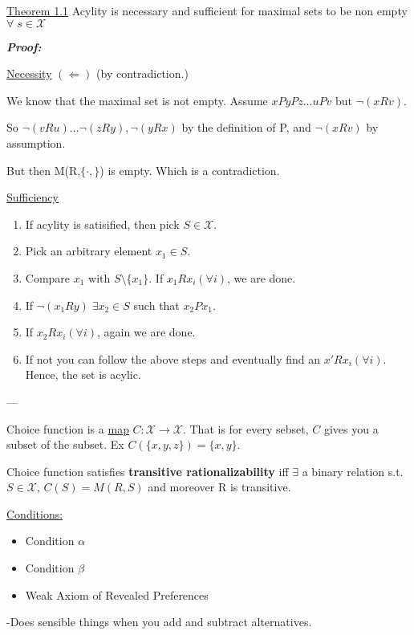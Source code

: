 \documentclass{article}
\newcommand{\X}{\mathcal{X}}
\begin{document}
\underline{Theorem 1.1}
Acylity is necessary and sufficient for maximal sets to be non empty $\forall \; s\in \X$

\textbf{\emph{Proof:}}

\underline{Necessity} $(\Leftarrow)$ (by contradiction.)

We know that the maximal set is not empty. 
Assume $xPyPz\dots uPv$ but $\neg(xRv)$.

So $\neg(vRu) \dots \neg(zRy),\neg(yRx)$ by the definition of P, and $\neg(xRv)$ by assumption.

But then M(R,$ \{ \cdot,\}$) is empty. Which is a contradiction.

\underline{Sufficiency}
\begin{enumerate}
\item If acylity is satisified, then pick $S \in \X$. 
\item Pick an arbitrary element $x_1 \in S$.
\item Compare $x_1$ with $S\setminus\{x_1\} $. If $x_1 R x_i (\forall i)$, we are done.
\item If $\neg (x_1 R y) \; \exists x_2 \in S$ such that $x_2Px_1$.
\item If $x_2 R x_i (\forall i)$, again we are done. 
\item If not you can follow the above steps and eventually find an $x' R x_i (\forall i)$. Hence, the set is acylic.  
\end{enumerate}


---


Choice function is a \underline{map} $C: \X \to \X$. That is for every sebset, $C$ gives you a subset of the subset. Ex $C(\{x,y,z\}) = \{x,y\} $.

\bigskip

Choice function satisfies \textbf{transitive rationalizability} iff $\exists$ a binary relation s.t. $S\in \X$, $C(S)=M(R,S)$ and moreover R is transitive.

\bigskip

\underline{Conditions:}


\begin{itemize}

\item Condition $\alpha$
\item Condition $\beta$
\item Weak Axiom of Revealed Preferences
\end{itemize}

-Does sensible things when you add and subtract alternatives.
\end{document}

